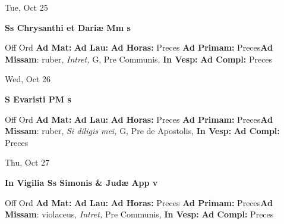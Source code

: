 \documentclass[10pt]{memoir}
\begin{document}
\begin{center}
\begin{minipage}{3.5in}
\vspace{2em}
\begin{center}Tue, Oct 25
\end{center}
\textbf{ \large Ss Chrysanthi et Dariæ Mm
\textnormal{\normalsize s}}

\begin{justify}Off Ord
\textbf{Ad Mat: }
\textbf{Ad Lau: }
\textbf{Ad Horas: }Preces
\textbf{Ad Primam: }Preces\textbf{Ad Missam}: ruber, \textit{Intret,} G, Pre Communis, 
\textbf{In Vesp: }
\textbf{Ad Compl: }Preces
\end{justify}
\end{minipage}
\end{center}

\begin{center}
\begin{minipage}{3.5in}
\vspace{2em}
\begin{center}Wed, Oct 26
\end{center}
\textbf{ \large S Evaristi PM
\textnormal{\normalsize s}}

\begin{justify}Off Ord
\textbf{Ad Mat: }
\textbf{Ad Lau: }
\textbf{Ad Horas: }Preces
\textbf{Ad Primam: }Preces\textbf{Ad Missam}: ruber, \textit{Si diligis mei,} G, Pre de Apostolis, 
\textbf{In Vesp: }
\textbf{Ad Compl: }Preces
\end{justify}
\end{minipage}
\end{center}

\begin{center}
\begin{minipage}{3.5in}
\vspace{2em}
\begin{center}Thu, Oct 27
\end{center}
\textbf{ \large In Vigilia Ss Simonis \& Judæ App
\textnormal{\normalsize v}}

\begin{justify}Off Ord
\textbf{Ad Mat: }
\textbf{Ad Lau: }
\textbf{Ad Horas: }Preces
\textbf{Ad Primam: }Preces\textbf{Ad Missam}: violaceus, \textit{Intret,} Pre Communis, 
\textbf{In Vesp: }
\textbf{Ad Compl: }Preces
\end{justify}
\end{minipage}
\end{center}
\end{document}
